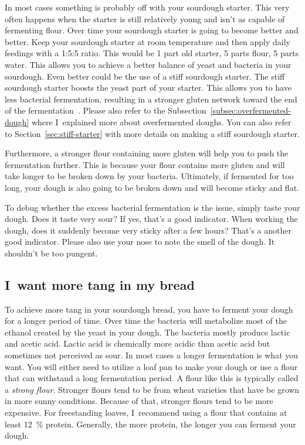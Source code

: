 In most cases something is probably off with your
sourdough starter. This very often happens when the starter
is still relatively young and isn't as capable of
fermenting flour. Over time your sourdough
starter is going to become better and better.
Keep your sourdough starter at room temperature
and then apply daily feedings with a 1:5:5 ratio.
This would be 1 part old starter, 5 parts flour,
5 parts water. This allows you to achieve a better
balance of yeast and bacteria in your sourdough.
Even better could be the use of a stiff sourdough
starter. The stiff sourdough starter boosts
the yeast part of your starter. This allows you
to have less bacterial fermentation, resulting
in a stronger gluten network toward the end
of the fermentation~\cite{stiff+starter}. Please
also refer to the Subsection~\ref{subsec:overfermented-dough} where
I~explained more about overfermented doughs. You can also
refer to Section~\ref{sec:stiff-starter} with more details on
making a stiff sourdough starter.

Furthermore, a stronger flour containing more gluten
will help you to push the fermentation further. This
is because your flour contains more gluten and will
take longer to be broken down by your bacteria. Ultimately,
if fermented for too long, your dough is also going
to be broken down and will become sticky and flat.

To debug whether the excess bacterial fermentation is the issue,
simply taste your dough. Does it taste very sour? If yes,
that's a good indicator. When working the dough, does it
suddenly become very sticky after a few hours? That's a
another good indicator. Please also use your nose to note
the smell of the dough. It shouldn't be too pungent.

\subsection{I~want more tang in my bread}

To achieve more tang in your sourdough bread, you have
to ferment your dough for a longer period of time.
Over time the bacteria will metabolize most of the
ethanol created by the yeast in your dough. The bacteria
mostly produce lactic and acetic acid. Lactic acid
is chemically more acidic than acetic acid but sometimes
not perceived as sour. In most cases a longer fermentation
is what you want. You will either need to utilize a loaf
pan to make your dough or use a flour that can withstand
a long fermentation period. A flour like this is typically
called a \emph{strong flour}. Stronger flours tend
to be from wheat varieties that have be grown in more
sunny conditions. Because of that, stronger flours tend
to be more expensive. For freestanding loaves, I~recommend
using a flour that contains at least \qty{12}{\percent} protein.
Generally, the more protein, the longer you can ferment your dough.


